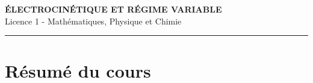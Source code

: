\documentclass[12pt,a4paper]{article}
\begin{document}
\fi

\begin{center}
  {\LARGE\bfseries ÉLECTROCINÉTIQUE ET RÉGIME VARIABLE}\\[0.3cm]
  {\normalsize Licence 1 - Mathématiques, Physique et Chimie}\\[0.1cm]
  \rule{0.7\textwidth}{0.8pt}
\end{center}

\vspace{0.3cm}

\section*{Résumé du cours}
\end{document}
